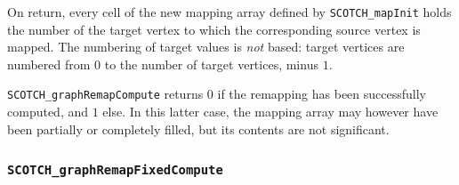 \begin{itemize}
On return, every cell of the new mapping array defined by
{\tt SCOTCH\_\lbt map\lbt Init} holds the number of the target
vertex to which the corresponding source vertex is mapped. The
numbering of target values is {\em not\/} based: target vertices are
numbered from $0$ to the number of target vertices, minus $1$.

\progret

{\tt SCOTCH\_graphRemapCompute} returns $0$ if the remapping has been
successfully computed, and $1$ else. In this latter case, the mapping
array may however have been partially or completely filled, but its
contents are not significant.
\end{itemize}

\subsubsection{{\tt SCOTCH\_graphRemapFixedCompute}}

